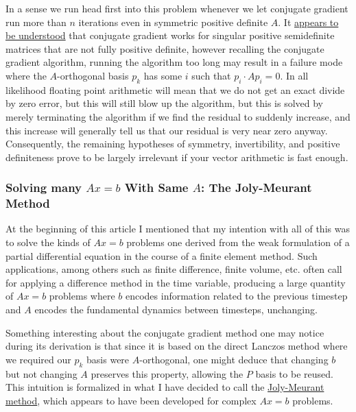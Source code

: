 \documentclass[11pt]{article}
\begin{document}
In a sense we run head first into this problem whenever we let conjugate gradient run more than $n$ iterations even in symmetric positive definite $A$. It \hyperlink{https://mathoverflow.net/questions/7903/conjugate-gradient-iteration}{appears to be understood} that conjugate gradient works for singular positive semidefinite matrices that are not fully positive definite, however recalling the conjugate gradient algorithm, running the algorithm too long may result in a failure mode where the $A$-orthogonal basis $p_k$ has some $i$ such that $p_i \cdot A p_i = 0$. In all likelihood floating point arithmetic will mean that we do not get an exact divide by zero error, but this will still blow up the algorithm, but this is solved by merely terminating the algorithm if we find the residual to suddenly increase, and this increase will generally tell us that our residual is very near zero anyway. Consequently, the remaining hypotheses of symmetry, invertibility, and positive definiteness prove to be largely irrelevant if your vector arithmetic is fast enough.

\subsubsection{Solving many $Ax=b$ With Same $A$: The Joly-Meurant Method}

At the beginning of this article I mentioned that my intention with all of this was to solve the kinds of $Ax=b$ problems one derived from the weak formulation of a partial differential equation in the course of a finite element method. Such applications, among others such as finite difference, finite volume, etc. often call for applying a difference method in the time variable, producing a large quantity of $Ax = b$ problems where $b$ encodes information related to the previous timestep and $A$ encodes the fundamental dynamics between timesteps, unchanging.

Something interesting about the conjugate gradient method one may notice during its derivation is that since it is based on the direct Lanczos method where we required our $p_k$ basis were $A$-orthogonal, one might deduce that changing $b$ but not changing $A$ preserves this property, allowing the $P$ basis to be reused. This intuition is formalized in what I have decided to call the \hyperlink{https://gerard-meurant.fr/cgc_1992.pdf}{Joly-Meurant method}, which appears to have been developed for complex $Ax=b$ problems.
\end{document}
